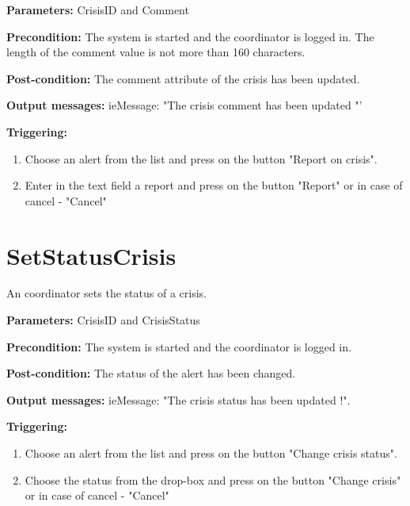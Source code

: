 \begin{description}
	\item \textbf{Parameters:} CrisisID and Comment
	\item \textbf{Precondition:} The system is started and the coordinator is
	logged in. The length of the comment value is not more than 160 characters.
	\item \textbf{Post-condition:} The comment attribute of the crisis has been
	updated.
	\item \textbf{Output messages:} ieMessage: "The crisis comment has
	been updated "'
	
	\item \textbf{Triggering:}
	
	\begin{enumerate}
		\item Choose an alert from the list and press on the button "Report on crisis".
		\item Enter in the text field a report and press on the button "Report" or in case of cancel - "Cancel"
	\end{enumerate}
\end{description}


\section{SetStatusCrisis}
\label{operation:SetStatusCrisis}

An coordinator sets the status of a crisis.

\begin{description}
	\item \textbf{Parameters:} CrisisID and CrisisStatus
	\item \textbf{Precondition:} The system is started and the coordinator is
	logged in.
	\item \textbf{Post-condition:} The status of the alert has been changed.
	\item \textbf{Output messages:} ieMessage: "The crisis status has been updated !".
	
	\item \textbf{Triggering:}
	
	\begin{enumerate}
		\item Choose an alert from the list and press on the button "Change crisis
		status".
		\item Choose the status from the drop-box and press on the button "Change
		crisis" or in case of cancel - "Cancel"
	\end{enumerate}
\end{description}


